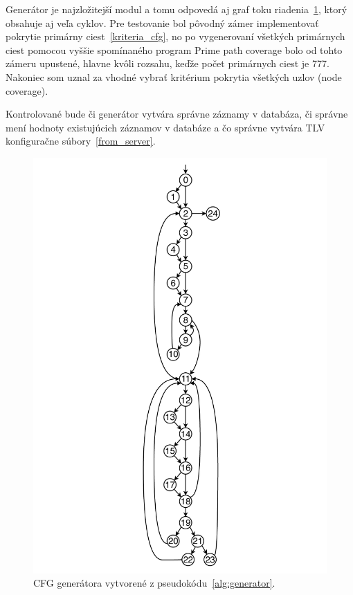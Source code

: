 Generátor je najzložitejší modul a tomu odpovedá aj graf toku riadenia~\ref{fig:cfg_gen}, ktorý obsahuje aj veľa cyklov.
Pre testovanie bol pôvodný zámer implementovať pokrytie primárny ciest~\ref{kriteria_cfg}, no po vygenerovaní všetkých primárnych ciest pomocou vyššie spomínaného program Prime path coverage bolo od tohto zámeru upustené, hlavne kvôli rozsahu, keďže počet primárnych ciest je 777.
Nakoniec som uznal za vhodné vybrať kritérium pokrytia všetkých uzlov (node coverage).

Kontrolované bude či generátor vytvára správne záznamy v databáza, či správne mení hodnoty existujúcich záznamov v databáze a čo správne vytvára TLV konfiguračne súbory~\ref{from_server}.

\begin{figure}[h]
	\centering
	\includegraphics[height=0.7\paperheight]{obrazky/cfg_generator.pdf}
	\caption{CFG generátora vytvorené z pseudokódu~\ref{alg:generator}.}
	\label{fig:cfg_gen}
\end{figure}


